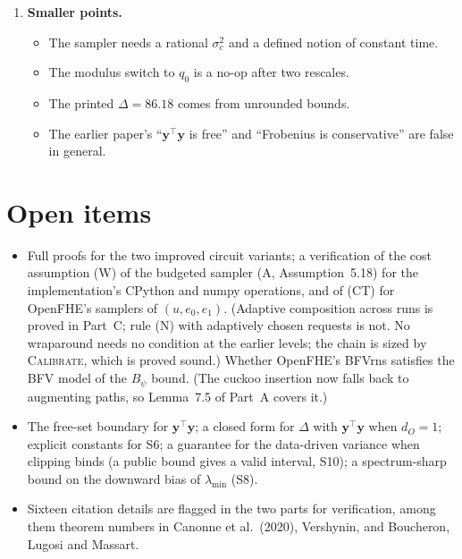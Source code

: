 \documentclass[11pt]{article}
\begin{document}
\begin{enumerate}[nosep]
\begin{itemize}[nosep]
      \item The private $\|\boldsymbol\beta\|$ bound is usually infinite while the ridge is active.
      \item The specification should state whether coverage is conditional on the gate.
    \end{itemize}
  \item \textbf{Smaller points.}
    \begin{itemize}[nosep]
      \item The sampler needs a rational $\sigma_c^2$ and a defined notion of constant time.
      \item The modulus switch to $q_0$ is a no-op after two rescales.
      \item The printed $\Delta=86.18$ comes from unrounded bounds.
      \item The earlier paper's ``$\mathbf y^\top\mathbf y$ is free'' and ``Frobenius is conservative'' are false in general.
    \end{itemize}
\end{enumerate}

\section*{Open items}
\begin{itemize}[nosep]
  \item Full proofs for the two improved circuit variants; a verification of the cost assumption (W) of the budgeted sampler (A, Assumption~5.18) for the implementation's CPython and numpy operations, and of (CT) for OpenFHE's samplers of $(u,e_0,e_1)$. (Adaptive composition across runs is proved in Part~C; rule (N) with adaptively chosen requests is not. No wraparound needs no condition at the earlier levels; the chain is sized by \textsc{Calibrate}, which is proved sound.) Whether OpenFHE's BFVrns satisfies the BFV model of the $B_\psi$ bound. (The cuckoo insertion now falls back to augmenting paths, so Lemma~7.5 of Part~A covers it.)
  \item The free-set boundary for $\mathbf y^\top\mathbf y$; a closed form for $\Delta$ with $\mathbf y^\top\mathbf y$ when $d_O=1$; explicit constants for S6; a guarantee for the data-driven variance when clipping binds (a public bound gives a valid interval, S10); a spectrum-sharp bound on the downward bias of $\lambda_{\min}$ (S8).
  \item Sixteen citation details are flagged in the two parts for verification, among them theorem numbers in Canonne et al.\ (2020), Vershynin, and Boucheron, Lugosi and Massart.
\end{itemize}

\clearpage
{}\label{partA}

\label{partB}

\label{partC}

\end{document}
